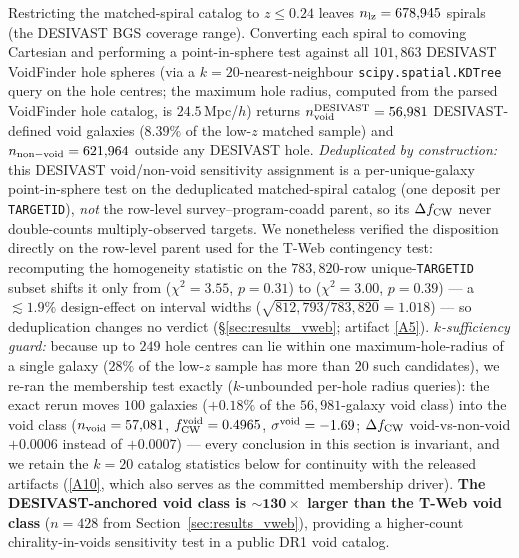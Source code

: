 \documentclass[aps,prd,twocolumn,superscriptaddress,showpacs,preprintnumbers,nofootinbib,longbibliography,floatfix]{revtex4-2}
\newcommand{\repoBase}{https://github.com/Hubify-Projects/bigbounce/blob/main}
\begin{document}
Restricting the matched-spiral catalog to $z \leq 0.24$ leaves
$n_{\rm lz} = 678{,}945$ spirals (the DESIVAST BGS coverage range).
Converting each spiral to comoving Cartesian and performing a
point-in-sphere test against all $101{,}863$ DESIVAST VoidFinder
hole spheres (via a $k = 20$-nearest-neighbour
\texttt{scipy.spatial.KDTree} query on the hole centres; the maximum
hole radius, computed from the parsed VoidFinder hole catalog, is
$24.5\,$Mpc/$h$) returns
$n_{\rm void}^{\rm DESIVAST} = 56{,}981$ DESIVAST-defined void galaxies
($8.39\%$ of the low-$z$ matched sample) and $n_{\rm non-void} =
621{,}964$ outside any DESIVAST hole.
\emph{Deduplicated by construction:} this DESIVAST void/non-void
sensitivity assignment is a per-unique-galaxy point-in-sphere test on
the deduplicated matched-spiral catalog (one deposit per
\texttt{TARGETID}), \emph{not} the row-level survey--program-coadd
parent, so its $\Delta f_{\rm CW}$ never double-counts multiply-observed
targets. We nonetheless verified the disposition directly on the
row-level parent used for the T-Web contingency test: recomputing the
homogeneity statistic on the $783{,}820$-row unique-\texttt{TARGETID}
subset shifts it only from ($\chi^2\!=\!3.55$, $p\!=\!0.31$) to
($\chi^2\!=\!3.00$, $p\!=\!0.39$) --- a $\lesssim\!1.9\%$ design-effect
on interval widths ($\sqrt{812{,}793/783{,}820}\!=\!1.018$) --- so
deduplication changes no verdict (\S\ref{sec:results_vweb}; artifact
\href{\repoBase/pipelines/p5\_desi\_chirality/outputs/21\_r23conf\_meta\_closures.json}{[A5]}).
\emph{$k$-sufficiency guard:} because up to $249$ hole centres can lie
within one maximum-hole-radius of a single galaxy ($28\%$ of the
low-$z$ sample has more than $20$ such candidates), we re-ran the
membership test exactly ($k$-unbounded per-hole radius queries):
the exact rerun moves $100$ galaxies ($+0.18\%$ of the
$56{,}981$-galaxy void class) into the void class
($n_{\rm void} = 57{,}081$, $f_{\rm CW}^{\rm void} = 0.4965$,
$\sigma^{\rm void} = -1.69$; $\Delta f_{\rm CW}$ void-vs-non-void
$+0.0006$ instead of $+0.0007$) — every conclusion in this section is
invariant, and we retain the $k=20$ catalog statistics below for
continuity with the released artifacts
(\href{\repoBase/pipelines/p5\_desi\_chirality/outputs/17\_v0151\_closure\_recomputes.json}{[A10]},
which also serves as the committed membership driver). \textbf{The DESIVAST-anchored
void class is $\boldsymbol{\sim\!130\times}$ larger than the T-Web void
class} ($n = 428$ from Section~\ref{sec:results_vweb}), providing a
higher-count chirality-in-voids sensitivity test in a public DR1 void
catalog.
\end{document}
